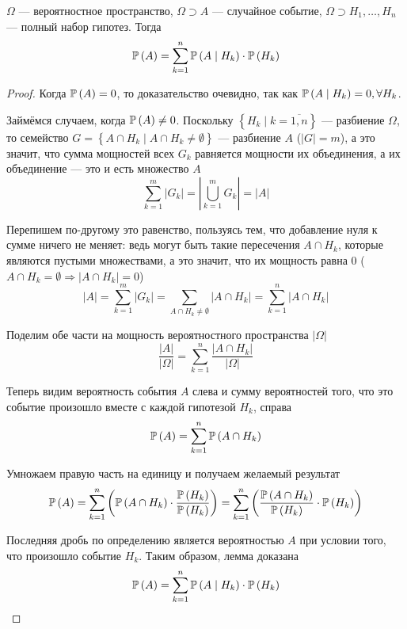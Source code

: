 \begin{lemma}
    $\Omega$ --- вероятностное пространство,
    $\Omega\supset A$ --- случайное событие,
    $\Omega\supset H_1, \dots, H_n$ --- полный набор гипотез.
    Тогда
    $$\mathbb{P}\left( A \right)
    =\sum_{k=1}^n \mathbb{P}\left( A\mid H_k \right)\cdot \mathbb{P}\left( H_k \right)$$
\end{lemma}
\begin{proof}
    Когда $\mathbb{P}\left( A \right)=0$, то доказательство очевидно,
    так как $\mathbb{P}\left( A\mid H_k \right)=0, \forall H_k$.

    Займёмся случаем, когда $\mathbb{P}\left( A \right)\neq 0$. Поскольку
    $\left\{H_k \mid k=\overline{1,n}\right\}$ --- разбиение $\Omega$,
    то семейство
    $G=\left\{A\cap H_k\mid A\cap H_k\neq\emptyset\right\}$ --- разбиение $A$
    ($\left|G\right|=m$),
    а это значит, что сумма мощностей всех $G_k$
    равняется мощности их объединения,
    а их объединение --- это и есть множество $A$
    $$\sum_{k=1}^m \left|G_k\right| = \left|\bigcup_{k=1}^m G_k\right|
    =\left|A\right|$$

    Перепишем по-другому это равенство, пользуясь тем, что
    добавление нуля к сумме ничего не меняет:
    ведь могут быть такие пересечения $A\cap H_k$,
    которые являются пустыми множествами,
    а это значит, что их мощность равна $0$
    ($A\cap H_k=\emptyset\Rightarrow\left|A\cap H_k\right|=0$)
    $$\left|A\right|=\sum_{k=1}^m \left|G_k\right|
    =\sum_{A\cap H_k\neq\emptyset} \left|A\cap H_k\right|
    =\sum_{k=1}^n \left|A\cap H_k\right|$$

    Поделим обе части на мощность вероятностного пространства $|\Omega|$
    $$\frac{\left|A\right|}{\left|\Omega\right|}
    =\sum_{k=1}^n \frac{\left|A\cap H_k\right|}{\left|\Omega\right|}$$

    Теперь видим вероятность события $A$ слева
    и сумму вероятностей того,
    что это событие произошло вместе с каждой гипотезой $H_k$, справа
    $$\mathbb{P}\left( A \right)=\sum_{k=1}^n \mathbb{P}\left( A\cap H_k \right)$$

    Умножаем правую часть на единицу и получаем желаемый результат
    $$\mathbb{P}\left( A \right)
    =\sum_{k=1}^n \left(\mathbb{P}\left( A\cap H_k \right)\cdot
        \frac{\mathbb{P}\left( H_k \right)}{\mathbb{P}\left( H_k \right)}\right)
    =\sum_{k=1}^n \left(\frac{\mathbb{P}\left( A\cap H_k \right)}{\mathbb{P}\left( H_k \right)}
        \cdot\mathbb{P}\left( H_k \right)\right)$$

    Последняя дробь по определению является вероятностью $A$ при условии
    того, что произошло событие $H_k$. Таким образом, лемма доказана
    $$\mathbb{P}\left( A \right)
    =\sum_{k=1}^n \mathbb{P}\left( A\mid H_k \right)\cdot\mathbb{P}\left( H_k \right)$$

\end{proof}
